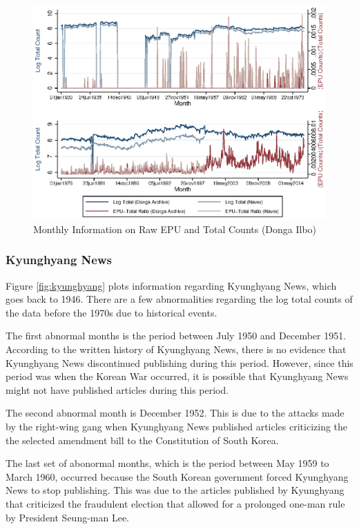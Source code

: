 \begin{landscape}
\begin{figure}[H] \caption{Monthly Information on Raw EPU and Total Counts (Donga Ilbo)} \label{fig:donga}
\begin{center}
\includegraphics[scale=1.45]{../output/plots/plot_donga_combined.eps} 
\end{center}
\end{figure}
\end{landscape}


\subsubsection{Kyunghyang News}
Figure \ref{fig:kyunghyang} plots information regarding Kyunghyang News, which goes back to 1946. There are a few abnormalities regarding the log total counts of the data before the 1970s due to historical events. 

The first abnormal months is the period between July 1950 and December 1951. According to the written history of Kyunghyang News, there is no evidence that Kyunghyang News discontinued publishing during this period. However, since this period was when the Korean War occurred, it is possible that Kyunghyang News might not have published articles during this period. 

The second abnormal month is December 1952. This is due to the attacks made by the right-wing gang when Kyunghyang News published articles criticizing the the selected amendment bill to the Constitution of South Korea. 

The last set of abonormal months, which is the period between May 1959 to March 1960, occurred because the South Korean government forced Kyunghyang News to stop publishing. This was due to the articles published by Kyunghyang that criticized the fraudulent election that allowed for a prolonged one-man rule by President Seung-man Lee.  

